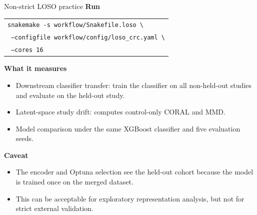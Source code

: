 \documentclass[aspectratio=169,10pt]{beamer}
\newcommand{\code}[1]{\texttt{\detokenize{#1}}}
\begin{document}
\begin{frame}{Non-strict LOSO practice}
\small
\textbf{Run}
\begin{center}
\scriptsize
\begin{tabular}{l}
\texttt{snakemake -s workflow/Snakefile.loso \textbackslash}\\
\texttt{  --configfile workflow/config/loso\_crc.yaml \textbackslash}\\
\texttt{  --cores 16}
\end{tabular}
\end{center}
\textbf{What it measures}
\begin{itemize}
  \item Downstream classifier transfer: train the classifier on all non-held-out studies and evaluate on the held-out study.
  \item Latent-space study drift: \code{loso_diagnostic} computes control-only CORAL and MMD.
  \item Model comparison under the same XGBoost classifier and five evaluation seeds.
\end{itemize}
\textbf{Caveat}
\begin{itemize}
  \item The encoder and Optuna selection see the held-out cohort because the model is trained once on the merged dataset.
  \item This can be acceptable for exploratory representation analysis, but not for strict external validation.
\end{itemize}
\end{frame}
\end{document}
